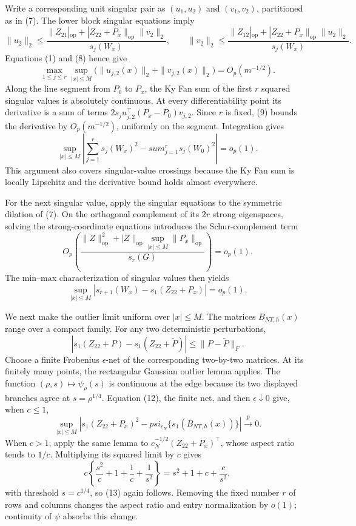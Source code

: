 Write a corresponding unit singular pair as \((u_1,u_2)\) and \((v_1,v_2)\), partitioned as in (7).  The lower block singular equations imply
\[
 \|u_2\|_2\leq
 \frac{\|Z_{21}|_{\mathrm{op}}+|Z_{22}+P_x\|_{\mathrm{op}}\|v_2\|_2}{s_j(W_x)},
 \qquad
 \|v_2\|_2\leq
 \frac{\|Z_{12}|_{\mathrm{op}}+|Z_{22}+P_x\|_{\mathrm{op}}\|u_2\|_2}{s_j(W_x)}.
\]
Equations (1) and (8) hence give
\[
 \max_{1\leq j\leq r}\sup_{|x|\leq M}
 \bigl(\|u_{j,2}(x)\|_2+\|v_{j,2}(x)\|_2\bigr)
 =O_p(m^{-1/2}). \tag{9}
\]
Along the line segment from \(P_0\) to \(P_x\), the Ky Fan sum of the first \(r\) squared singular values is absolutely continuous.  At every differentiability point its derivative is a sum of terms
\(2s_j u_{j,2}^{\top}(P_x-P_0)v_{j,2}\).  Since \(r\) is fixed, (9) bounds the derivative by \(O_p(m^{-1/2})\), uniformly on the segment.  Integration gives
\[
 \sup_{|x|\leq M}\left|
 \sum_{j=1}^r s_j(W_x)^2-sum_{j=1}^r s_j(W_0)^2
 \right|=o_p(1). \tag{10}
\]
This argument also covers singular-value crossings because the Ky Fan sum is locally Lipschitz and the derivative bound holds almost everywhere.

For the next singular value, apply the singular equations to the symmetric dilation of (7).  On the orthogonal complement of its \(2r\) strong eigenspaces, solving the strong-coordinate equations introduces the Schur-complement term
\[
 O_p\!\left(\frac{\|Z\|_{\mathrm{op}}^2+|Z\|_{\mathrm{op}}\sup_{|x|\leq M}\|P_x\|_{\mathrm{op}}}
 {s_r(G)}\right)=o_p(1).
\]
The min--max characterization of singular values then yields
\[
 \sup_{|x|\leq M}
 \left|s_{r+1}(W_x)-s_1(Z_{22}+P_x)\right|=o_p(1). \tag{11}
\]

We next make the outlier limit uniform over \(|x|\leq M\).  The matrices \(B_{NT,h}(x)\) range over a compact family.  For any two deterministic perturbations,
\[
 |s_1(Z_{22}+P)-s_1(Z_{22}+\widetilde P)|
 \leq\|P-\widetilde P\|_F. \tag{12}
\]
Choose a finite Frobenius \(\epsilon\)-net of the corresponding two-by-two matrices.  At its finitely many points, the rectangular Gaussian outlier lemma applies.  The function \((\rho,s)\mapsto\psi_\rho(s)\) is continuous at the edge because its two displayed branches agree at \(s=\rho^{1/4}\).  Equation (12), the finite net, and then \(\epsilon\downarrow0\) give, when \(c\leq1\),
\[
 \sup_{|x|\leq M}\left|
 s_1(Z_{22}+P_x)^2-psi_{c_N}\{s_1(B_{NT,h}(x))\}
 \right|\xrightarrow{p}0. \tag{13}
\]
When \(c>1\), apply the same lemma to \(c_N^{-1/2}(Z_{22}+P_x)^{\top}\), whose aspect ratio tends to \(1/c\).  Multiplying its squared limit by \(c\) gives
\[
 c\left\{\frac{s^2}{c}+1+\frac1c+\frac1{s^2}\right\}
 =s^2+1+c+\frac c{s^2},
\]
with threshold \(s=c^{1/4}\), so (13) again follows.  Removing the fixed number \(r\) of rows and columns changes the aspect ratio and entry normalization by \(o(1)\); continuity of \(\psi\) absorbs this change.

